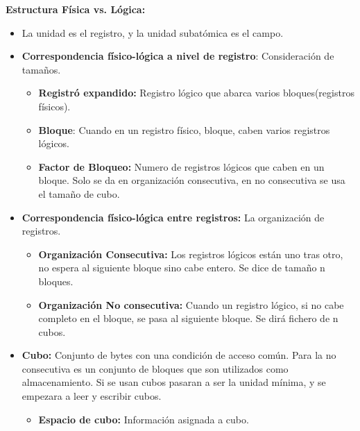 \documentclass[12pt, twoside, openright]{report} %
\begin{document}
  
  \textbf{Estructura Física vs. Lógica:}
  

  \begin{itemize}
  \item La unidad es el registro, y la unidad subatómica es el campo.
    
  \item \textbf{Correspondencia físico-lógica a nivel de registro}:
    Consideración de tamaños.
    

    \begin{itemize}
    \item \textbf{Registró expandido:} Registro lógico que abarca varios
      bloques(registros físicos).
      
    \item \textbf{Bloque}: Cuando en un registro físico, bloque, caben
      varios registros lógicos.
      
    \item \textbf{Factor de Bloqueo:} Numero de registros lógicos que caben
      en un bloque. Solo se da en organización consecutiva, en no
      consecutiva se usa el tamaño de cubo.
      
    \end{itemize}
  \item \textbf{Correspondencia físico-lógica entre registros:} La
    organización de registros.
    

    \begin{itemize}
    \item \textbf{Organización Consecutiva:} Los registros lógicos están uno
      tras otro, no espera al siguiente bloque sino cabe entero. Se
      dice de tamaño n bloques.
      
    \item \textbf{Organización No consecutiva:} Cuando un registro lógico,
      si no cabe completo en el bloque, se pasa al siguiente bloque. Se
      dirá fichero de n cubos.
      
    \end{itemize}
  \item \textbf{Cubo:} Conjunto de bytes con una condición de acceso común.
    Para la no consecutiva es un conjunto de bloques que son utilizados
    como almacenamiento. Si se usan cubos pasaran a ser la unidad
    mínima, y se empezara a leer y escribir cubos.
    

    \begin{itemize}
    \item \textbf{Espacio de cubo:} Información asignada a cubo.
      

\end{itemize}
\end{itemize}
\end{document}
